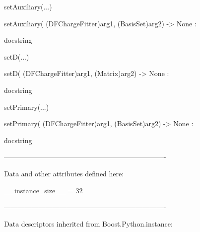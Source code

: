 \documentclass[letterpaper,10pt,english]{sphinxmanual}
\begin{document}
\begin{description}
\begin{description}
\begin{DUlineblock}{0em}
\begin{DUlineblock}{\DUlineblockindent}
\begin{DUlineblock}{\DUlineblockindent}
\end{DUlineblock}
\end{DUlineblock}
\item[] setAuxiliary(...)
\item[]
\begin{DUlineblock}{\DUlineblockindent}
\item[] setAuxiliary( (DFChargeFitter)arg1, (BasisSet)arg2) -\textgreater{} None :
\item[]
\begin{DUlineblock}{\DUlineblockindent}
\item[] docstring
\item[] 
\end{DUlineblock}
\end{DUlineblock}
\item[] setD(...)
\item[]
\begin{DUlineblock}{\DUlineblockindent}
\item[] setD( (DFChargeFitter)arg1, (Matrix)arg2) -\textgreater{} None :
\item[]
\begin{DUlineblock}{\DUlineblockindent}
\item[] docstring
\item[] 
\end{DUlineblock}
\end{DUlineblock}
\item[] setPrimary(...)
\item[]
\begin{DUlineblock}{\DUlineblockindent}
\item[] setPrimary( (DFChargeFitter)arg1, (BasisSet)arg2) -\textgreater{} None :
\item[]
\begin{DUlineblock}{\DUlineblockindent}
\item[] docstring
\item[] 
\end{DUlineblock}
\end{DUlineblock}
\item[] ----------------------------------------------------------------------
\item[] Data and other attributes defined here:
\item[] 
\item[] \_\_instance\_size\_\_ = 32
\item[] 
\item[] ----------------------------------------------------------------------
\item[] Data descriptors inherited from Boost.Python.instance:

\end{DUlineblock}
\end{description}
\end{description}
\end{document}
